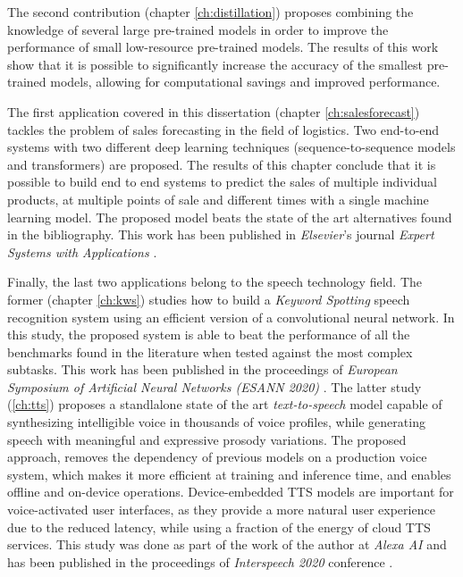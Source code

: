 The second contribution (chapter \ref{ch:distillation}) proposes combining the knowledge of several large pre-trained models in order to improve the performance of small low-resource pre-trained models. The results of this work show that it is possible to significantly increase the accuracy of the smallest pre-trained models, allowing for computational savings and improved performance.

The first application covered in this dissertation (chapter \ref{ch:salesforecast}) tackles the problem of sales forecasting in the field of logistics. Two end-to-end systems with two different deep learning techniques (sequence-to-sequence models and transformers) are proposed. The results of this chapter conclude that it is possible to build end to end systems to predict the sales of multiple individual products, at multiple points of sale and different times with a single machine learning model. The proposed model beats the state of the art alternatives found in the bibliography. This work has been published in \textit{Elsevier}'s journal \textit{Expert Systems with Applications} \autocite{valles2021c}.

Finally, the last two applications belong to the speech technology field. The former (chapter \ref{ch:kws}) studies how to build a \textit{Keyword Spotting} speech recognition system using an efficient version of a convolutional neural network. In this study, the proposed system is able to beat the performance of all the benchmarks found in the literature when tested against the most complex subtasks. This work has been published in the proceedings of \textit{European Symposium of Artificial Neural Networks (ESANN 2020)} \autocite{valles2021a}. The latter study (\ref{ch:tts}) proposes a standlalone state of the art \textit{text-to-speech} model capable of synthesizing intelligible voice in thousands of voice profiles, while generating speech with meaningful and expressive prosody variations. The proposed approach, removes the dependency of previous models on a production voice system, which makes it more efficient at training and inference time, and enables offline and on-device operations. Device-embedded TTS models are important for voice-activated user interfaces, as they provide a more natural user experience due to the reduced latency, while using a fraction of the energy of cloud TTS services. This study was done as part of the work of the author at \textit{Alexa AI} and has been published in the proceedings of \textit{Interspeech 2020} conference \autocite{valles2021b}.

